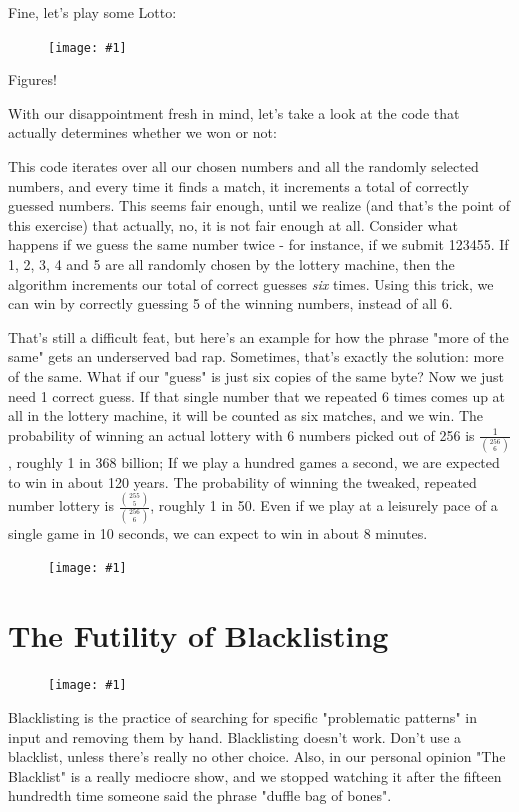 \documentclass{article}
\newcommand{\displayimage}[1] {
\begin{figure}[H]
    \centering
    \texttt{[image: \#1]} 
\end{figure}
}
\newcommand{\wrapimageright}[1] {
    \begin{figure}
        \begin{center}
            \texttt{[image: \#1]} 
        \end{center}
    \end{figure}
}
\begin{document}
Fine, let's play some Lotto:

\displayimage{./exercises/12_lotto/normal_game.png}

Figures!

With our disappointment fresh in mind, let's take a look at the code that actually determines whether we won or not:



This code iterates over all our chosen numbers and all the randomly selected numbers, and every time it finds a match, it increments a total of correctly guessed numbers. This seems fair enough, until we realize (and that's the point of this exercise) that actually, no, it is not fair enough at all. Consider what happens if we guess the same number twice - for instance, if we submit 123455. If 1, 2, 3, 4 and 5 are all randomly chosen by the lottery machine, then the algorithm increments our total of correct guesses \textit{six} times. Using this trick, we can win by correctly guessing 5 of the winning numbers, instead of all 6.

That's still a difficult feat, but here's an example for how the phrase "more of the same" gets an underserved bad rap. Sometimes, that's exactly the solution: more of the same. What if our "guess" is just six copies of the same byte? Now we just need 1 correct guess. If that single number that we repeated 6 times comes up at all in the lottery machine, it will be counted as six matches, and we win. The probability of winning an actual lottery with 6 numbers picked out of 256 is $\frac{1}{{256 \choose 6}}$, roughly 1 in 368 billion; If we play a hundred games a second, we are expected to win in about 120 years. The probability of winning the tweaked, repeated number lottery is $\frac{{255 \choose 5}}{{256 \choose 6}}$, roughly 1 in 50. Even if we play at a leisurely pace of a single game in 10 seconds, we can expect to win in about 8 minutes.

\displayimage{./exercises/12_lotto/flag.png}

\section{The Futility of Blacklisting}

\wrapimageright{./images/aint_no_rule.jpg}
Blacklisting is the practice of searching for specific "problematic patterns" in input and removing them by hand. Blacklisting doesn't work. Don't use a blacklist, unless there's really no other choice. Also, in our personal opinion "The Blacklist" is a really mediocre show, and we stopped watching it after the fifteen hundredth time someone said the phrase "duffle bag of bones".
\end{document}
